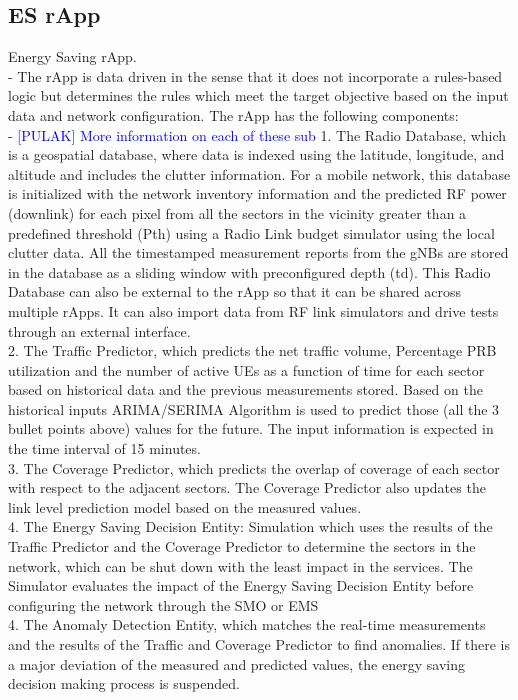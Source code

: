 \documentclass[conference]{IEEEtran}
\begin{document}
\subsection{ES rApp}
Energy Saving rApp.
\\
- The rApp is data driven in the sense that it does not incorporate a rules-based logic but determines the rules which meet the target objective based on the input data and network configuration. The rApp has the following components: \\
- \textcolor{blue}{[PULAK] More information on each of these sub}
1. The Radio Database, which is a geospatial database, where data is indexed using the latitude, longitude, and altitude and includes the clutter information. For a mobile network, this database is initialized with the network inventory information and the predicted RF power (downlink) for each pixel from all the sectors in the vicinity greater than a predefined threshold (Pth) using a Radio Link budget simulator using the local clutter data. All the timestamped measurement reports from the gNBs are stored in the database as a sliding window with preconfigured depth (td). This Radio Database can also be external to the rApp so that it can be shared across multiple rApps. It can also import data from RF link simulators and drive tests through an external interface. \\
2.  The Traffic Predictor, which predicts the net traffic volume, Percentage PRB utilization and the number of active UEs as a function of time for each sector based on historical data and the previous measurements stored. Based on the historical inputs ARIMA/SERIMA Algorithm is used to predict those (all the 3 bullet points above) values for the future. The input information is expected in the time interval of 15 minutes. \\
3. The Coverage Predictor, which predicts the overlap of coverage of each sector with respect to the adjacent sectors. The Coverage Predictor also updates the link level prediction model based on the measured values. \\
4. The Energy Saving Decision Entity: Simulation which uses the results of the Traffic Predictor and the Coverage Predictor to determine the sectors in the network, which can be shut down with the least impact in the services. The Simulator evaluates the impact of the Energy Saving Decision Entity before configuring the network through the SMO or EMS \\
4. The Anomaly Detection Entity, which matches the real-time measurements and the results of the Traffic and Coverage Predictor to find anomalies. If there is a major deviation of the measured and predicted values, the energy saving decision making process is suspended. \\
\end{document}
